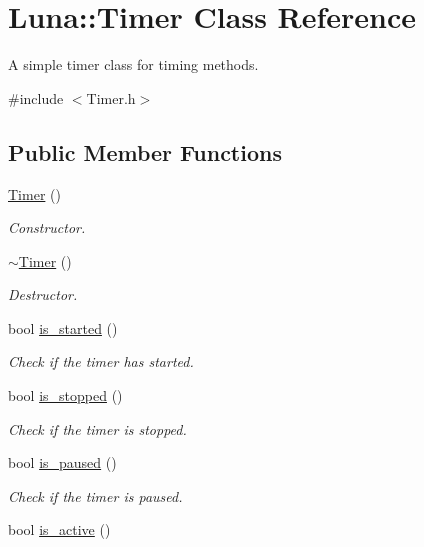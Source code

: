 \hypertarget{classLuna_1_1Timer}{}\section{Luna\+:\+:Timer Class Reference}
\label{classLuna_1_1Timer}


A simple timer class for timing methods.  




{\ttfamily \#include $<$Timer.\+h$>$}

\subsection*{Public Member Functions}
\begin{DoxyCompactItemize}
\item 
\hyperlink{classLuna_1_1Timer_a8505121ba140f41121a57e4404e1d251}{Timer} ()
\begin{DoxyCompactList}\small\item\em Constructor. \end{DoxyCompactList}\item 
\hyperlink{classLuna_1_1Timer_af53efaf19a32dd49cc3c84671603d352}{$\sim$\+Timer} ()
\begin{DoxyCompactList}\small\item\em Destructor. \end{DoxyCompactList}\item 
bool \hyperlink{classLuna_1_1Timer_acd735003d27555b69bc3c54e8cd4a301}{is\+\_\+started} ()
\begin{DoxyCompactList}\small\item\em Check if the timer has started. \end{DoxyCompactList}\item 
bool \hyperlink{classLuna_1_1Timer_aa028fb717dce42cbf9806ce604ba09b6}{is\+\_\+stopped} ()
\begin{DoxyCompactList}\small\item\em Check if the timer is stopped. \end{DoxyCompactList}\item 
bool \hyperlink{classLuna_1_1Timer_a006199b985e14e421d7dc1ef5d6e08a8}{is\+\_\+paused} ()
\begin{DoxyCompactList}\small\item\em Check if the timer is paused. \end{DoxyCompactList}\item 
bool \hyperlink{classLuna_1_1Timer_a025d787c4a3c7cc94e920e0ae480488f}{is\+\_\+active} ()

\end{DoxyCompactItemize}
